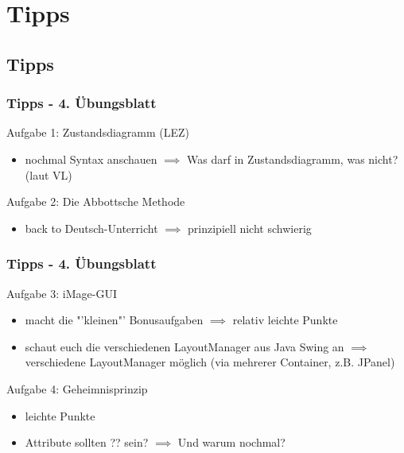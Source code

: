 \documentclass[18pt]{beamer}
\begin{document}

\section{Tipps}
	\subsection{Tipps}
	\begin{frame}
		\frametitle{Tipps - 4. Übungsblatt}
			\begin{exampleblock}{Aufgabe 1: Zustandsdiagramm (LEZ)}
				\begin{itemize}
					\item nochmal Syntax anschauen 
					\linebreak $\implies$ Was darf in Zustandsdiagramm, was nicht? (laut VL)
				\end{itemize}
			\end{exampleblock}
			\pause
			\begin{exampleblock}{Aufgabe 2: Die Abbottsche Methode}
				\begin{itemize}
					\item back to Deutsch-Unterricht
					\linebreak $\implies$ prinzipiell nicht schwierig
				\end{itemize}
			\end{exampleblock}
	\end{frame}

	\begin{frame}
		\frametitle{Tipps - 4. Übungsblatt}
			\begin{exampleblock}{Aufgabe 3: iMage-GUI}
				\begin{itemize}
					\item macht die "'kleinen"' Bonusaufgaben 
					\linebreak $\implies$ relativ leichte Punkte \pause
					\item schaut euch die verschiedenen LayoutManager aus Java Swing an
					\linebreak $\implies$ verschiedene LayoutManager möglich (via mehrerer Container, z.B. JPanel)
				\end{itemize}
			\end{exampleblock}
			\pause
			\begin{exampleblock}{Aufgabe 4: Geheimnisprinzip}
				\begin{itemize}
					\item leichte Punkte
					\item Attribute sollten ?? sein? 
					\linebreak $\implies$ Und warum nochmal?
				\end{itemize}
			\end{exampleblock}
	\end{frame}
	
\end{document}
